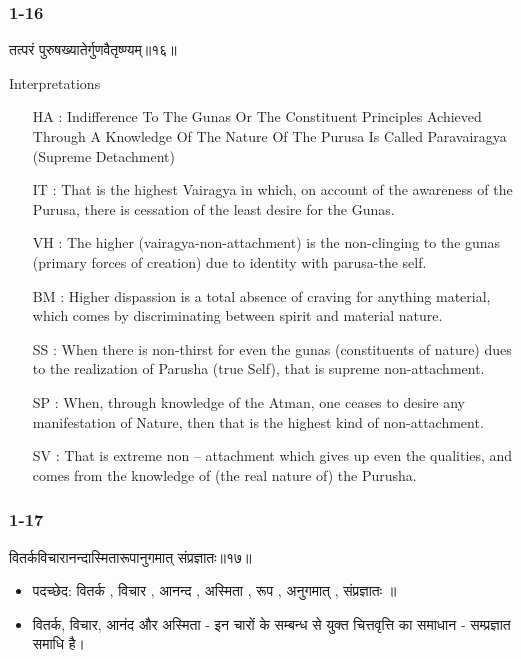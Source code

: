 \begin{frame}[fragile]\frametitle{1-16}
\begin{sanskrit}
तत्परं पुरुषख्यातेर्गुणवैतृष्ण्यम्॥१६॥
\end{sanskrit}

Interpretations
\begin{itemize}		
\item [HA]: Indifference To The Gunas Or The Constituent Principles Achieved Through A Knowledge Of The Nature Of The Purusa Is Called Paravairagya (Supreme Detachment)
\item [IT]: That is the highest Vairagya in which, on account of the awareness of the Purusa, there is cessation of the least desire for the Gunas.
\item [VH]: The higher (vairagya-non-attachment) is the non-clinging to the gunas (primary forces of creation) due to identity with parusa-the self.
\item [BM]: Higher dispassion is a total absence of craving for anything material, which comes by discriminating between spirit and material nature.
\item [SS]: When there is non-thirst for even the gunas (constituents of nature) dues to the realization of Parusha (true Self), that is supreme non-attachment.
\item [SP]: When, through knowledge of the Atman, one ceases to desire any manifestation of Nature, then that is the highest kind of non-attachment.
\item [SV]: That is extreme non – attachment which gives up even the qualities, and comes from the knowledge of (the real nature of) the Purusha. 
\end{itemize}
	
\end{frame}

\begin{frame}[fragile]\frametitle{1-17}
\begin{sanskrit}
वितर्कविचारानन्दास्मितारूपानुगमात् संप्रज्ञातः॥१७॥
\end{sanskrit}

\begin{itemize}
\item पदच्छेद: वितर्क , विचार , आनन्द , अस्मिता , रूप , अनुगमात् , संप्रज्ञातः ॥
\item वितर्क, विचार, आनंद और अस्मिता - इन चारों के सम्बन्ध से युक्त चित्तवृत्ति का समाधान - सम्प्रज्ञात समाधि है।
\end{itemize}
	
\end{frame}

